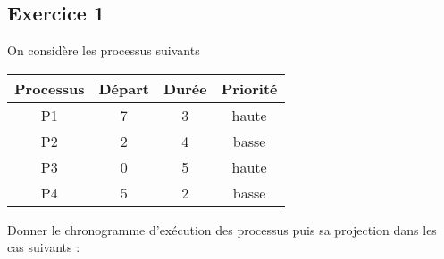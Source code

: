 \documentclass[a4paper,12pt,french]{article}
\begin{document}

\subsection*{Exercice 1}
On considère les processus suivants
\begin{center}
\begin{tabular}{|c|c|c|c|}
\hline\rowcolor{UGLiOrange}
\textbf{\color{white} Processus} & \textbf{\color{white}Départ} & \textbf{\color{white}Durée} & \textbf{\color{white}Priorité} \\
\hline
P1 & 7 & 3 & haute \\
\hline
P2 & 2 & 4 & basse \\
\hline
P3 & 0 & 5 & haute \\
\hline
P4 & 5 & 2 & basse \\
\hline
\end{tabular}
\end{center}
Donner le chronogramme d'exécution des processus puis sa projection dans les cas suivants :
\end{document}
